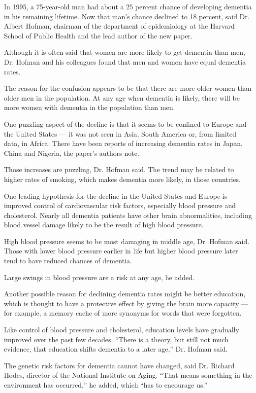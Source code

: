 In 1995, a 75-year-old man had about a 25 percent chance of developing
dementia in his remaining lifetime. Now that man's chance declined to 18
percent, said Dr. Albert Hofman, chairman of the department of
epidemiology at the Harvard School of Public Health and the lead author
of the new paper.

Although it is often said that women are more likely to get dementia
than men, Dr. Hofman and his colleagues found that men and women have
equal dementia rates.

The reason for the confusion appears to be that there are more older
women than older men in the population. At any age when dementia is
likely, there will be more women with dementia in the population than
men.

One puzzling aspect of the decline is that it seems to be confined to
Europe and the United States --- it was not seen in Asia, South America
or, from limited data, in Africa. There have been reports of increasing
dementia rates in Japan, China and Nigeria, the paper's authors note.

Those increases are puzzling, Dr. Hofman said. The trend may be related
to higher rates of smoking, which makes dementia more likely, in those
countries.

One leading hypothesis for the decline in the United States and Europe
is improved control of cardiovascular risk factors, especially blood
pressure and cholesterol. Nearly all dementia patients have other brain
abnormalities, including blood vessel damage likely to be the result of
high blood pressure.

High blood pressure seems to be most damaging in middle age, Dr. Hofman
said. Those with lower blood pressure earlier in life but higher blood
pressure later tend to have reduced chances of dementia.

Large swings in blood pressure are a risk at any age, he added.

Another possible reason for declining dementia rates might be better
education, which is thought to have a protective effect by giving the
brain more capacity --- for example, a memory cache of more synonyms for
words that were forgotten.

Like control of blood pressure and cholesterol, education levels have
gradually improved over the past few decades. ``There is a theory, but
still not much evidence, that education shifts dementia to a later
age,'' Dr. Hofman said.

The genetic risk factors for dementia cannot have changed, said Dr.
Richard Hodes, director of the National Institute on Aging. ``That means
something in the environment has occurred,'' he added, which ``has to
encourage us.''


